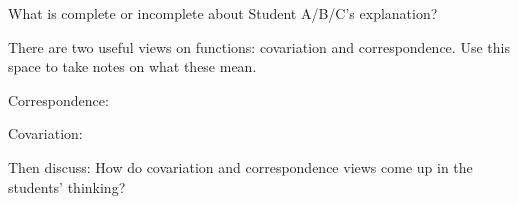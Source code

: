 \documentclass[11pt]{article}
\newenvironment{task}
	{\begin{mdframed}[linecolor=lightgray, linewidth=3pt]\raggedright}
	{\end{mdframed}}
\theoremstyle{definition}
\begin{document}
\begin{task}
What is complete or incomplete about Student A/B/C's explanation?
%
%
%
%
%
%
\end{task}

\begin{task}
There are two useful views on functions: covariation and correspondence. Use this space to take notes on what these mean.

Correspondence: 

Covariation: 

Then discuss: How do covariation and correspondence views come up in the students' thinking?
\end{task}
\end{document}
